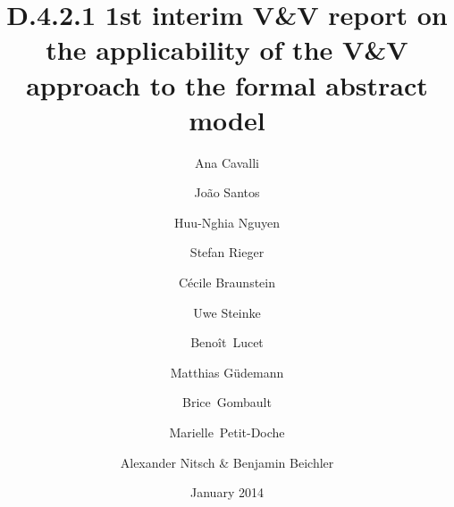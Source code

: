 \documentclass{template/openetcs_article}
\begin{document}
\frontmatter
{}




\title{D.4.2.1 1st interim V\&V report on the applicability of the V\&V approach to the formal abstract model}

\subtitle{}

\date{January 2014}

\author{Ana Cavalli \and João Santos \and Huu-Nghia Nguyen}

  
\author{Stefan Rieger}


\author{Cécile Braunstein}
  
\author{Uwe Steinke}

\author{Benoît~Lucet \and Matthias Güdemann \and Brice~Gombault \and Marielle~Petit-Doche} 


\author{Alexander Nitsch \& Benjamin Beichler}

  

\reporttype{}






\maketitle \tableofcontents \listoffiguresandtables \newpage
\end{document}
